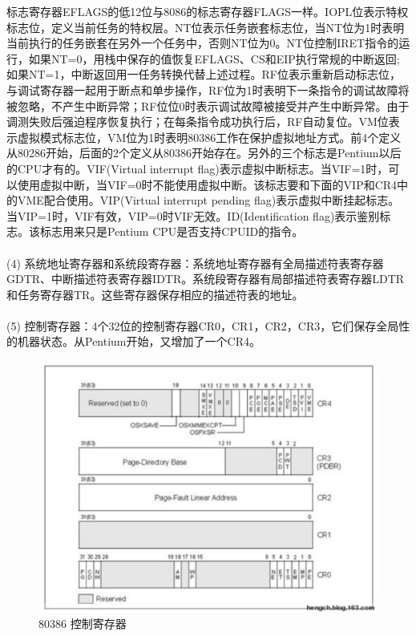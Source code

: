 \documentclass[12pt]{article}
\begin{document}
标志寄存器EFLAGS的低12位与8086的标志寄存器FLAGS一样。IOPL位表示特权标志位，定义当前任务的特权层。NT位表示任务嵌套标志位，当NT位为1时表明当前执行的任务嵌套在另外一个任务中，否则NT位为0。NT位控制IRET指令的运行，如果NT=0，用栈中保存的值恢复EFLAGS、CS和EIP执行常规的中断返回; 如果NT=1，中断返回用一任务转换代替上述过程。RF位表示重新启动标志位，与调试寄存器一起用于断点和单步操作，RF位为1时表明下一条指令的调试故障将被忽略，不产生中断异常；RF位位0时表示调试故障被接受并产生中断异常。由于调测失败后强迫程序恢复执行；在每条指令成功执行后，RF自动复位。VM位表示虚拟模式标志位，VM位为1时表明80386工作在保护虚拟地址方式。前4个定义从80286开始，后面的2个定义从80386开始存在。另外的三个标志是Pentium以后的CPU才有的。VIF(Virtual interrupt flag)表示虚拟中断标志。当VIF=1时，可以使用虚拟中断，当VIF=0时不能使用虚拟中断。该标志要和下面的VIP和CR4中的VME配合使用。VIP(Virtual interrupt pending flag)表示虚拟中断挂起标志。当VIP=1时，VIF有效，VIP=0时VIF无效。ID(Identification flag)表示鉴别标志。该标志用来只是Pentium CPU是否支持CPUID的指令。\\\\
(4) 系统地址寄存器和系统段寄存器：系统地址寄存器有全局描述符表寄存器GDTR、中断描述符表寄存器IDTR。系统段寄存器有局部描述符表寄存器LDTR和任务寄存器TR。这些寄存器保存相应的描述符表的地址。\\\\
(5) 控制寄存器：4个32位的控制寄存器CR0，CR1，CR2，CR3，它们保存全局性的机器状态。从Pentium开始，又增加了一个CR4。\\
\begin{figure}[htbp]
\centering
\includegraphics[scale=0.5]{fig/24.png}
\caption{80386 控制寄存器}
\label{fig:80386 CR regeisters}
\end{figure}
\end{document}
